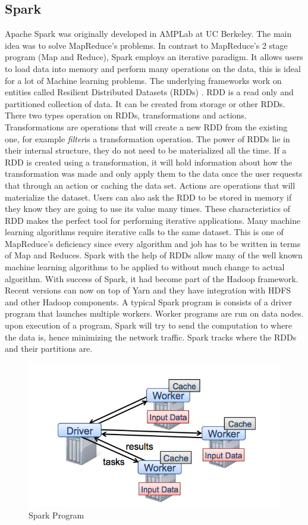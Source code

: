 \documentclass[english]{tktltiki}
\begin{document}
\subsection{Spark}
Apache Spark \cite{zaharia10} was originally developed in AMPLab at UC Berkeley. The main idea was to solve MapReduce's problems. In contrast to MapReduce's 2 stage program (Map and Reduce), Spark employs an iterative paradigm. It allows users to load data into memory and perform many operations on the data, this is ideal for a lot of Machine learning problems. The underlying frameworks work on entities called Resilient Distributed Datasets (RDDs) \cite{zaharia12}. RDD  is a read only and partitioned collection of data. It can be created from storage or other RDDs. There two types operation on RDDs, transformations and actions. Transformations are operations that will create a new RDD from the existing one, for example \textit{filter}is a transformation operation. The power of RDDs lie in their internal structure, they do not need to be materialized all the time. If a RDD is created using a transformation, it will hold information about how the transformation was made and only apply them to the data once the user requests that through an action or caching the data set. Actions are operations that will materialize the dataset. Users can also ask the RDD to be stored in memory if they know they are going to use its value many times. These characteristics of RDD makes the perfect tool for performing iterative applications. Many machine learning algorithms require iterative calls to the same dataset. This is one of MapReduce's deficiency since every algorithm and job has to be written in terms of Map and Reduces. Spark with the help of RDDs allow many of the well known machine learning algorithms to be applied to without much change to actual algorithm. With success of Spark, it had become part of the Hadoop framework. Recent versions can now on top of Yarn and they have integration with HDFS and other Hadoop components. 
A typical Spark program is consists of a driver program that launches multiple workers. Worker programs are run on data nodes. upon execution of a program, Spark will try to send the computation to where the data is, hence minimizing the network traffic. Spark tracks where the RDDs and their partitions are.
\begin{figure}[ht!]
\centering
\includegraphics[width=130mm]{figures/sparkprogram.png}
\caption{Spark Program}
\end{figure}
\end{document}
